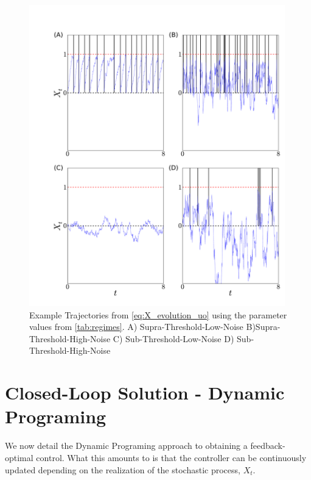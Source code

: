 \documentclass[12pt]{iopart}
\begin{document}
\begin{figure}[htp]
\begin{center}
  \includegraphics[width=0.99\textwidth]{Figs/PathSimulator/path_T=14_combined.pdf}
  \caption[labelInTOC]{Example Trajectories from \cref{eq:X_evolution_uo}
  using the parameter values from \cref{tab:regimes}. 
  A) Supra-Threshold-Low-Noise 
  B)Supra-Threshold-High-Noise 
  C) Sub-Threshold-Low-Noise
  D) Sub-Threshold-High-Noise 
  }
  \label{fig:regime_path_examples}
\end{center}
\end{figure}

\section{Closed-Loop Solution - Dynamic Programing}
We now detail the Dynamic Programing approach to obtaining a feedback-optimal
control. What this amounts to is that the controller can be continuously updated
depending on the realization of the stochastic process, $X_t$.
\end{document}
